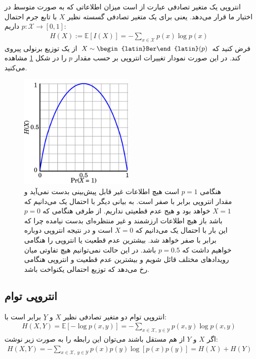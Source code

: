 انتروپی یک متغیر تصادفی عبارت از است میزان اطلاعاتی که به صورت متوسط در اختیار ما قرار می‌دهد. یعنی برای یک متغیر تصادفی گسسته نظیر $X$ با تابع جرم احتمال $p:\mathcal{X}\rightarrow [0,1]$ داریم:
\begin{align*}
    H(X) := \mathbb{E}\left[I(X)\right] =  - \sum_{x\in \mathcal{X}}p(x) \log p(x) 
\end{align*}
فرض کنید که $X\sim \text{\begin{latin}Ber\end{latin}}(p)$ از یک توزیع برنولی پیروی کند. در این صورت نمودار تغییرات انتروپی بر حسب مقدار $p$ را در شکل \ref{fig:entropy} مشاهده می‌کنید.
\begin{figure}
    \centering
    \includegraphics[width=0.5\textwidth]{figs/entropy.png}
    \caption{هنگامی $p=1$ است هیچ اطلاعات غیر قابل پیش‌بینی بدست نمی‌آید و مقدار انتروپی برابر با صفر است. به بیانی دیگر با احتمال یک می‌دانیم که $X=1$ خواهد بود و هیج عدم قطعیتی نداریم.
    از طرفی هنگامی که $p=0$ باشد باز هیچ اطلاعات ارزشمند و غیر منتظره‌ای بدست‌ نیامده چرا که این بار با احتمال یک می‌دانیم که $X=0$ است و در نتیجه انتروپی دوباره برابر با صفر خواهد شد.
    بیشترین عدم قطعیت یا انتروپی را هنگامی خواهیم داشت که $p=0.5$ باشد.
    در این حالت نمی‌توانیم هیچ تفاوتی میان رویدادهای مختلف قائل شویم و بیشترین عدم قطعیت و انتروپی هنگامی رخ می‌دهد که توزیع احتمالی یکنواخت باشد.}
    \label{fig:entropy}
\end{figure}

\subsection{انتروپی توام}

 انتروپی توام دو متغیر تصادفی نظیر $X$ و $ِY$ برابر است با:
\begin{align*}
    H(X,Y) = \mathbb{E}\left[-\log p(x,y)\right] = - \sum_{x\in \mathcal{X},~ y \in \mathcal{Y}}p(x,y) \log p(x,y) 
\end{align*}
اگر $X$ و $Y$ از هم مستقل باشند می‌توان این رابطه را به صورت زیر نوشت:
\begin{align*}
    H(X,Y) =  - \sum_{x\in \mathcal{X},~ y \in \mathcal{Y}}p(x)p(y) \log \left[p(x)p(y) \right] = H(X) + H(Y)
\end{align*}

